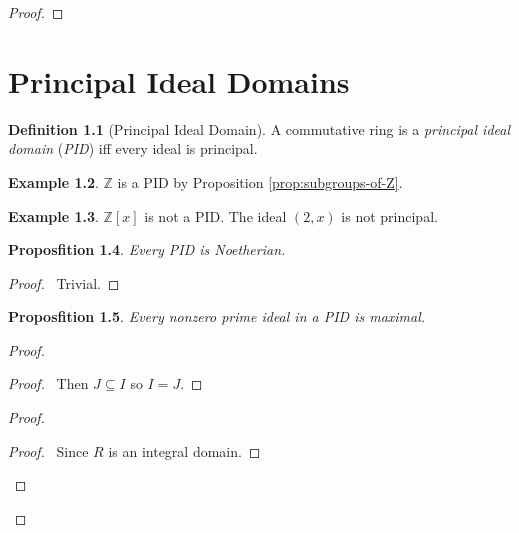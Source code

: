 \documentclass{book}
\let\qed\relax
\newtheorem{prop}{Proposfition}[chapter]
\theoremstyle{definition}
\newtheorem{df}[prop]{Definition}
\newtheorem{ex}[prop]{Example}
\newcommand{\inv}[1]{\ensuremath{{#1}^{-1}}}
\begin{document}
\begin{proof}
\pf
{}
\step{3}{\pflet{$\inv{\phi}(I) = (a_1, \ldots, a_n)$}}
\qed
\end{proof}

\chapter{Principal Ideal Domains}

\begin{df}[Principal Ideal Domain]
A commutative ring is a \emph{principal ideal domain} (\emph{PID}) iff every ideal is principal.
\end{df}

\begin{ex}
$\mathbb{Z}$ is a PID by Proposition \ref{prop:subgroups-of-Z}.
\end{ex}

\begin{ex}
$\mathbb{Z}[x]$ is not a PID. The ideal $(2,x)$ is not principal.
\end{ex}

\begin{prop}
Every PID is Noetherian.
\end{prop}

\begin{proof}
\pf\ Trivial. \qed
\end{proof}

\begin{prop}
Every nonzero prime ideal in a PID is maximal.
\end{prop}

\begin{proof}
\pf
{}
\begin{proof}
	\pf\ Then $J \subseteq I$ so $I = J$.
\end{proof}
\begin{proof}
	\begin{proof}
		\pf\ Since $R$ is an integral domain.
	\end{proof}
\end{proof}
\qed
\end{proof}
\end{document}
